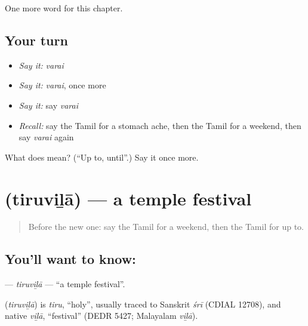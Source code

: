 \begin{grammarlens}[title={What you've built}]
One more word for this chapter.
\end{grammarlens}

\subsection*{Your turn}
\begin{itemize}
\raggedright
  \item \emph{Say it:} \emph{varai}
  \item \emph{Say it:} \emph{varai}, once more
  \item \emph{Say it:} say \emph{varai}
  \item \emph{Recall:} say the Tamil for a stomach ache, then the Tamil for a weekend, then say \emph{varai} again
\end{itemize}

\begin{tcolorbox}[breakable,colback=teal!4,colframe=teal!35!black,title={Before you move on}]
What does  mean? (\textquotedblleft{}Up to, until\textquotedblright{}.) Say it once more.
\end{tcolorbox}
\section[\texorpdfstring{\ta{திருவிழா} (tiruviḻā)}{திருவிழா (tiruviḻā)}]{ (tiruviḻā) — a temple festival}

\label{lesson:TA-C202-tiruvila}



\begin{quote}
Before the new one: say the Tamil for a weekend, then the Tamil for up to.
\end{quote}

\subsection*{You'll want to know: }
\textbf{} — \emph{tiruviḻā} — \textquotedblleft{}a temple festival\textquotedblright{}.

\begin{cousinweb}
\textbf{} (\emph{tiruviḻā}) is \emph{tiru}, \textquotedblleft{}holy\textquotedblright{}, usually traced to Sanskrit \emph{śrī} (CDIAL 12708), and native \emph{viḻā}, \textquotedblleft{}festival\textquotedblright{} (DEDR 5427; Malayalam \emph{viḻā}).
\end{cousinweb}

